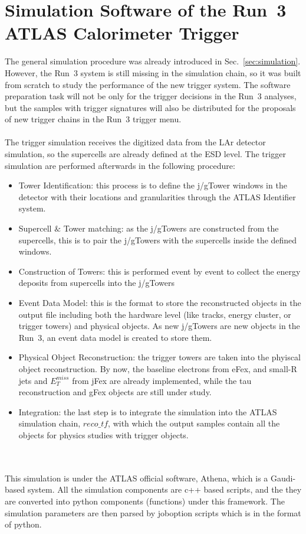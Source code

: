 \section{Simulation Software of the Run~3 ATLAS Calorimeter Trigger}
The general simulation procedure was already introduced in Sec.~\ref{sec:simulation}. However, the Run~3 system is still missing in the simulation chain, so it was built from scratch to study the performance of the new trigger system. The software preparation task will not be only for the trigger decisions in the Run~3 analyses, but the samples with trigger signatures will also be distributed for the proposals of new trigger chains in the Run~3 trigger menu. 
\\
\\The trigger simulation receives the digitized data from the LAr detector simulation, so the supercells are already defined at the ESD level. The trigger simulation are performed afterwards in the following procedure:
\begin{itemize}
	\item Tower Identification: this process is to define the j/gTower windows in the detector with their locations and granularities through the ATLAS Identifier system.
	\item Supercell $\&$ Tower matching: as the j/gTowers are constructed from the supercells, this is to pair the j/gTowers with the supercells inside the defined windows.
	\item Construction of Towers: this is performed event by event to collect the energy deposits from supercells into the j/gTowers
	\item Event Data Model: this is the format to store the reconstructed objects in the output file including both the hardware level (like tracks, energy cluster, or trigger towers) and physical objects. As new j/gTowers are new objects in the Run~3, an event data model is created to store them.
	\item Physical Object Reconstruction: the trigger towers are taken into the phyiscal object reconstruction. By now, the baseline electrons from eFex, and small-R jets and $E^{miss}_{T}$ from jFex are already implemented, while the tau reconstruction and gFex objects are still under study. 
	\item Integration: the last step is to integrate the simulation into the ATLAS simulation chain, $reco\_tf$, with which the output samples contain all the objects for physics studies with trigger objects. 
\end{itemize}
\noindent
\\
\\This simulation is under the ATLAS official software, Athena, which is a Gaudi-based system\cite{Mato:2010zz}. All the simulation components are c++ based scripts, and the they are converted into python components (functions) under this framework. The simulation parameters are then parsed by joboption scripts which is in the format of python. 

